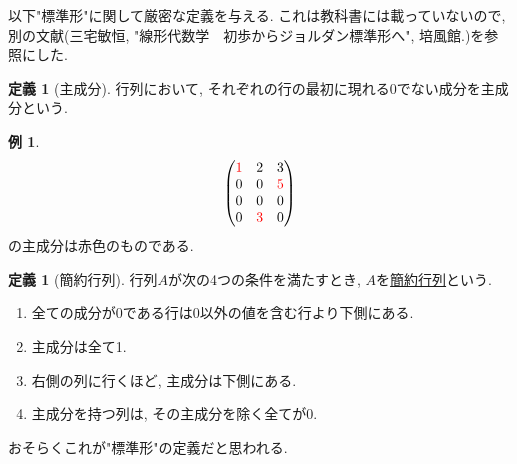 \documentclass[dvipdfmx,a4paper,11pt]{article}
\theoremstyle{definition}
\newtheorem{dfn}[thm]{定義}
\newtheorem{exa}[thm]{例}
\newcommand{\xr}[1]{\textcolor{red}{#1}}
\begin{document}
 以下"標準形"に関して厳密な定義を与える. 
 これは教科書には載っていないので, 別の文献(三宅敏恒, "線形代数学　初歩からジョルダン標準形へ", 培風館.)を参照にした. 
 
\begin{tcolorbox}[
    colback = white,
    colframe = green!35!black,
    fonttitle = \bfseries,
    breakable = true]
    \begin{dfn}[主成分]
   \label{dfn-main}
  行列において, それぞれの行の最初に現れる0でない成分を主成分という.
  \end{dfn}
 \end{tcolorbox}
 
 \begin{exa}
 $$
  \begin{pmatrix}
\xr{1} & 2&3\\
0 & 0&\xr{5}\\
0 & 0&0\\
0 & \xr{3}&0\\ 
 \end{pmatrix}
 $$
 の主成分は赤色のものである. 
 \end{exa}


 \begin{tcolorbox}[
    colback = white,
    colframe = green!35!black,
    fonttitle = \bfseries,
    breakable = true]
    \begin{dfn}[簡約行列]
  行列$A$が次の4つの条件を満たすとき, $A$を\underline{簡約行列}という.
  \begin{enumerate}
  	\setlength{\parskip}{0cm}
  	\setlength{\itemsep}{0pt} 
\item 全ての成分が0である行は0以外の値を含む行より下側にある. 
\item 主成分は全て1.
\item 右側の列に行くほど, 主成分は下側にある.
\item 主成分を持つ列は, その主成分を除く全てが0.
  \end{enumerate}
  \end{dfn}
 \end{tcolorbox}
 おそらくこれが"標準形"の定義だと思われる. 
 
\end{document}
